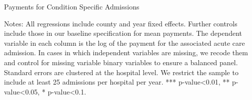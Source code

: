 \documentclass[12pt]{article}
\begin{document}
\newpage
{}
\setlength{\captionmargin}{.5 \textwidth} \addtolength{\captionmargin}{-.5\wd\gfxbox}
\begin{table}[!h]
\centering
\caption{Payments for Condition Specific Admissions}
\label{tab:eachcondition}
\usebox{\gfxbox}
\par
\begin{minipage}{\wd\gfxbox}
\footnotesize
Notes: All regressions include county and year fixed effects.  Further controls include those in our baseline specification for mean payments.  The dependent variable in each column is the log of the payment for the associated acute care admission.  In cases in which independent variables are missing, we recode them and control for missing variable binary variables to ensure a balanced panel.  Standard errors are clustered at the hospital level.  We restrict the sample to include at least 25 admissions per hospital per year.  *** p-value<0.01, ** p-value<0.05, * p-value<0.1.
\end{minipage}
\end{table}
\end{document}
